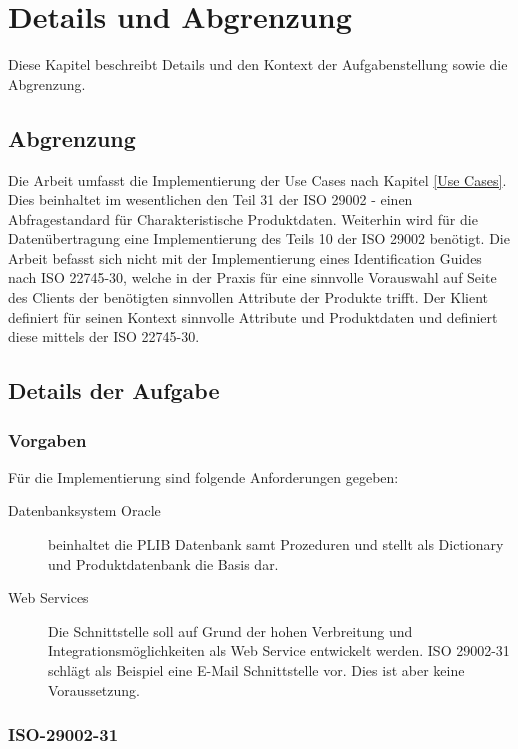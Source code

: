 \section{Details und Abgrenzung}

Diese Kapitel beschreibt Details und den Kontext der Aufgabenstellung sowie die Abgrenzung.

\subsection{Abgrenzung}

Die Arbeit umfasst die Implementierung der Use Cases nach Kapitel \ref{Use Cases}. Dies beinhaltet im wesentlichen den Teil 31 der ISO 29002 - einen Abfragestandard für Charakteristische Produktdaten. Weiterhin wird für die Datenübertragung eine Implementierung des Teils 10 der ISO 29002 benötigt. Die Arbeit befasst sich nicht mit der Implementierung eines Identification Guides nach ISO 22745-30, welche in der Praxis für eine sinnvolle Vorauswahl auf Seite des Clients der benötigten sinnvollen Attribute der Produkte trifft. Der Klient definiert für seinen Kontext sinnvolle Attribute und Produktdaten und definiert diese mittels der ISO 22745-30.

\subsection{Details der Aufgabe}

\subsubsection{Vorgaben}

Für die Implementierung sind folgende Anforderungen gegeben:
\begin{description}
\item[Datenbanksystem Oracle] beinhaltet die PLIB Datenbank samt Prozeduren und stellt als Dictionary und Produktdatenbank die Basis dar.
\item[Web Services] Die Schnittstelle soll auf Grund der hohen Verbreitung und Integrationsmöglichkeiten als Web Service entwickelt werden. ISO 29002-31 schlägt als Beispiel eine E-Mail Schnittstelle vor. Dies ist aber keine Voraussetzung. 
\end{description}

\subsubsection{ISO-29002-31}

